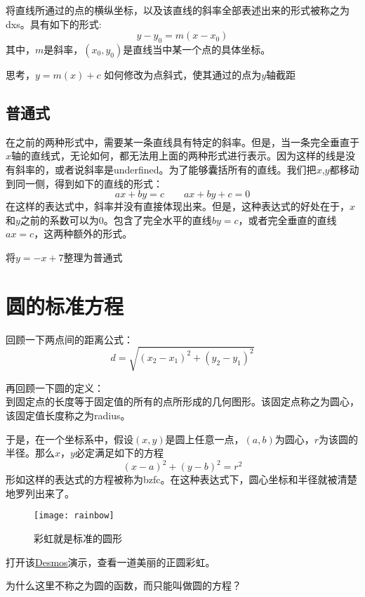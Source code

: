 将直线所通过的点的横纵坐标，以及该直线的斜率全部表述出来的形式被称之为\gls{dxs}。具有如下的形式:
\[
	y-y_0 = m(x-x_0)
\]
其中，$m$是斜率，$(x_0,y_0)$是直线当中某一个点的具体坐标。

\begin{TaskBox}
思考，$y=m(x)+c$ 如何修改为点斜式，使其通过的点为$y$轴截距
\end{TaskBox}


\subsection*{普通式}
\label{subsec:Standard Form of a line}
在之前的两种形式中，需要某一条直线具有特定的斜率。但是，当一条完全垂直于$x$轴的直线式，无论如何，都无法用上面的两种形式进行表示。因为这样的线是没有斜率的，或者说斜率是underfined。为了能够囊括所有的直线。我们把$x$,$y$都移动到同一侧，得到如下的直线的形式：
\[
	ax+by=c \qquad ax+by+c=0
\]
在这样的表达式中，斜率并没有直接体现出来。但是，这种表达式的好处在于，$x$和$y$之前的系数可以为0。包含了完全水平的直线$by=c$，或者完全垂直的直线$ax=c$，这两种额外的形式。

\begin{TaskBox}
将$y=-x+7$整理为普通式
\end{TaskBox}
\clearpage


\section{圆的标准方程}
\label{sec:Standard Equation of a Cricle}
回顾一下两点间的距离公式：
\[
	d=\sqrt{(x_2-x_1)^2+(y_2-y_1)^2}
\]

再回顾一下圆的定义：\\
到固定点的长度等于固定值的所有的点所形成的几何图形。该固定点称之为圆心，该固定值长度称之为\gls{radius}。

于是，在一个坐标系中，假设$(x,y)$是圆上任意一点，$(a,b)$为圆心，$r$为该圆的半径。那么$x$，$y$必定满足如下的方程
\[
	(x-a)^2+(y-b)^2=r^2
\]
形如这样的表达式的方程被称为\gls{bzfc}。在这种表达式下，圆心坐标和半径就被清楚地罗列出来了。

\begin{figure}[H]
\centering
\texttt{[image: rainbow]}
\caption{彩虹就是标准的圆形}
\end{figure}

打开该\href{https://www.desmos.com/calculator/nasxcwsa73}{Desmos}演示，查看一道美丽的正圆彩虹。

\begin{TaskBox}
为什么这里不称之为圆的函数，而只能叫做圆的方程？
\end{TaskBox}

